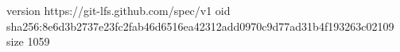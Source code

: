 version https://git-lfs.github.com/spec/v1
oid sha256:8e6d3b2737e23fc2fab46d6516ea42312add0970c9d77ad31b4f193263c02109
size 1059
